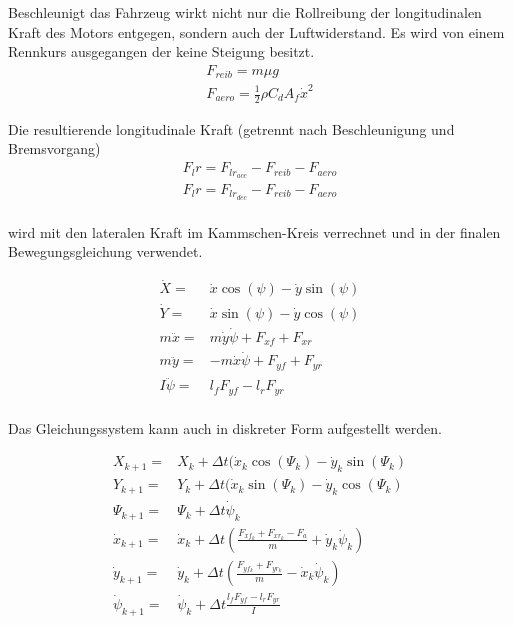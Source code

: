 \documentclass{like}
\begin{document}
Beschleunigt das Fahrzeug wirkt nicht nur die Rollreibung der longitudinalen Kraft des Motors entgegen, sondern auch der Luftwiderstand. Es wird von einem Rennkurs ausgegangen der keine Steigung besitzt.
\begin{eqnarray}
F_{reib} = m \mu g \\
F_{aero} = \frac{1}{2} \rho C_d A_f \dot{x}^2
\end{eqnarray}

Die resultierende longitudinale Kraft (getrennt nach Beschleunigung und Bremsvorgang)
\begin{eqnarray}
F_lr = F_{lr_{acc}} - F_{reib} - F_{aero}\\
F_lr = F_{lr_{dec}} - F_{reib} - F_{aero}\\
\end{eqnarray}

wird mit den lateralen Kraft im Kammschen-Kreis verrechnet und in der finalen Bewegungsgleichung verwendet.

\begin{eqnarray}
\dot{X} =& \dot{x} \cos(\psi) - \dot{y} \sin(\psi) \\
\dot{Y} =& \dot{x} \sin(\psi) - \dot{y} \cos(\psi) \\
m \ddot{x} =& m \dot{y} \dot{\psi} + F_{xf} +  F_{xr}\\
m \ddot{y} =& - m \dot{x} \dot{\psi} +  F_{yf} +  F_{yr} \\
I \ddot{\psi} =&  l_f F_{yf} -  l_r F_{yr} \\
\end{eqnarray}

Das Gleichungssystem kann auch in diskreter Form aufgestellt werden.

\begin{eqnarray}
X_{k+1} =& X_k + \Delta t(\dot{x}_k \cos(\Psi_k) - \dot{y}_k \sin(\Psi_k) \\
Y_{k+1} =& Y_{k} + \Delta t(\dot{x}_k \sin(\Psi_k) - \dot{y}_k \cos(\Psi_k) \\
\Psi_{k+1} =& \Psi_k + \Delta t \dot{\psi}_k \\
\dot{x}_{k+1} =&  \dot{x}_k + \Delta t (\frac{F_{xf_k} +  F_{xr_k}- F_a}{m} + \dot{y}_k \dot{\psi}_k) \\
\dot{y}_{k+1} =&  \dot{y}_k + \Delta t (\frac{ F_{yf_k} +  F_{yr_k}}{m} - \dot{x}_k \dot{\psi}_k)  \\
\dot{\psi}_{k+1} =& \dot{\psi}_k + \Delta t \frac{ l_f F_{yf} -  l_r F_{yr}}{I} \\
\end{eqnarray}
\end{document}
